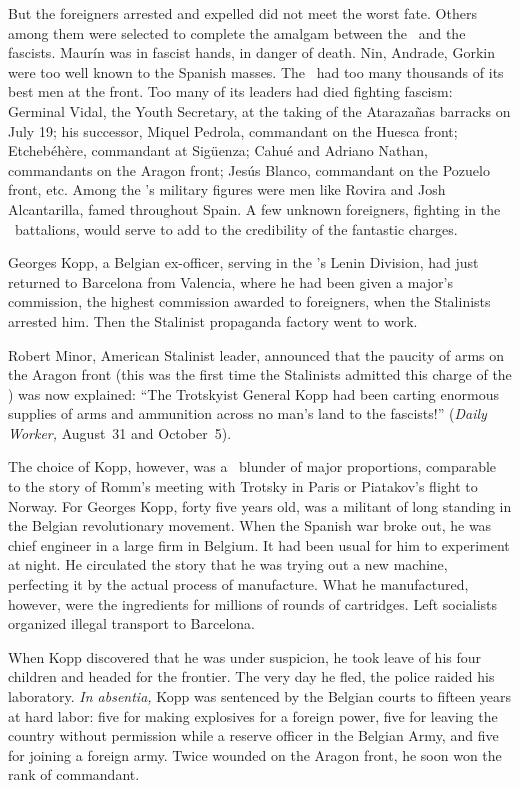 But the foreigners arrested and expelled did not meet the worst fate. Others among them were selected to complete the amalgam between the \POUM\ and the fascists. Maur\'in was in fascist hands, in danger of death. Nin, Andrade, Gorkin were too well known to the Spanish masses. The \POUM\ had too many thousands of its best men at the front. Too many of its leaders had died fighting fascism: Germinal Vidal, the Youth Secretary, at the taking of the Atarazañas barracks on July 19; his successor, Miquel Pedrola, commandant on the Huesca front; Etcheb\'eh\`ere, commandant at Sig\"uenza; Cahué and Adriano Nathan, commandants on the Aragon front; Jes\'us Blanco, commandant on the Pozuelo front, etc. Among the \POUM’s military figures were men like Rovira and Josh Alcantarilla, famed throughout Spain. A few unknown foreigners, fighting in the \POUM\ battalions, would serve to add to the credibility of the fantastic charges.

Georges Kopp, a Belgian ex-officer\kn, serving in the \POUM’s Lenin Division, had just returned to Barcelona from Valencia, where he had been given a major’s commission, the highest commission awarded to foreigners, when the Stalinists arrested him.
Then the Stalinist propaganda factory went to work.

Robert Minor, American Stalinist leader, announced that the pau\-ci\-ty of arms on the Aragon front (this was the first time the Stalinists admitted this charge of the \CNT) was now explained: ``The Trotskyist General Kopp had been carting enormous supplies of arms and ammunition across no man’s land to the fascists!'' (\emph{Daily Worker,} August~31 and October~5).

The choice of Kopp, however\kn, was a \GPU\ blunder of major proportions, comparable to the story of Romm’s meeting with Trotsky in Paris or Piatakov’s flight to Norway. For Georges Kopp, forty five years old, was a militant of long standing in the Belgian revolutionary movement. When the Spanish war broke out, he was chief engineer in a large firm in Belgium. It had been usual for him to experiment at night. He circulated the story that he was trying out a new machine, perfecting it by the actual process of manufacture. What he manufactured, however, were the ingredients for millions of rounds of cartridges. Left socialists organized illegal transport to Barcelona.

When Kopp discovered that he was under suspicion, he took leave of his four children and headed for the frontier. The very day he fled, the police raided his laboratory. \emph{In absentia,} Kopp was sentenced by the Belgian courts to fifteen years at hard labor: five for making explosives for a foreign power, five for leaving the country without permission while a reserve officer in the Belgian Army\kn, and five for joining a foreign army. Twice wounded on the Aragon front, he soon won the rank of commandant.\kn{}

